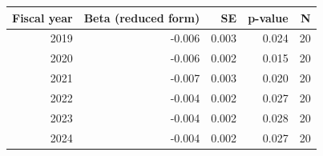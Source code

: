 \begin{tabular}{rrrrr}
\toprule
Fiscal year & Beta (reduced form) & SE & p-value & N \\
\midrule
2019 & -0.006 & 0.003 & 0.024 & 20 \\
2020 & -0.006 & 0.002 & 0.015 & 20 \\
2021 & -0.007 & 0.003 & 0.020 & 20 \\
2022 & -0.004 & 0.002 & 0.027 & 20 \\
2023 & -0.004 & 0.002 & 0.028 & 20 \\
2024 & -0.004 & 0.002 & 0.027 & 20 \\
\bottomrule
\end{tabular}
